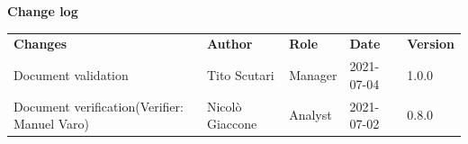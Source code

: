 \documentclass[a4paper]{article}
\begin{document}
\begin{titlepage}
\begin{center}
    \end{center}
\end{titlepage}

\begin{center}
    \textbf{\Large Change log}\\
    \vspace{10px}
    \begin{table}[h!]
        \centering
        \renewcommand{\arraystretch}{1.8}
        \begin{tabular}{p{150px} p{90px} p{80px} p{60px} p{45px}}
            \rowcolor{logo!70} \textbf{Changes}                  & \textbf{Author}   & \textbf{Role} & \textbf{Date} & \textbf{Version} \\
            Document validation                                  & Tito Scutari      & Manager       & 2021-07-04    & 1.0.0            \\
            Document verification\newline(Verifier: Manuel Varo) & Nicolò Giaccone   & Analyst       & 2021-07-02    & 0.8.0            \\



\end{tabular}
\end{table}
\end{center}
\end{document}
